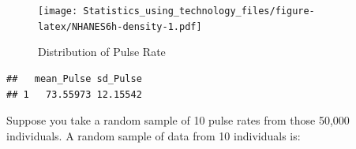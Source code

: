 \documentclass[
]{book}
\newenvironment{Shaded}{\begin{snugshade}}{\end{snugshade}}
\newcommand{\DataTypeTok}[1]{\textcolor[rgb]{0.13,0.29,0.53}{#1}}
\newcommand{\DecValTok}[1]{\textcolor[rgb]{0.00,0.00,0.81}{#1}}
\newcommand{\KeywordTok}[1]{\textcolor[rgb]{0.13,0.29,0.53}{\textbf{#1}}}
\newcommand{\NormalTok}[1]{#1}
\newcommand{\OperatorTok}[1]{\textcolor[rgb]{0.81,0.36,0.00}{\textbf{#1}}}
\newcommand{\StringTok}[1]{\textcolor[rgb]{0.31,0.60,0.02}{#1}}
\begin{document}
\begin{figure}
\centering
\texttt{[image: Statistics\_using\_technology\_files/figure-latex/NHANES6h-density-1.pdf]}
\caption{\label{fig:NHANES6h-density}Distribution of Pulse Rate}
\end{figure}

\begin{verbatim}
##   mean_Pulse sd_Pulse
## 1   73.55973 12.15542
\end{verbatim}

Suppose you take a random sample of 10 pulse rates from those 50,000 individuals. A random sample of data from 10 individuals is:

\begin{Shaded}
\end{Shaded}
\end{document}
